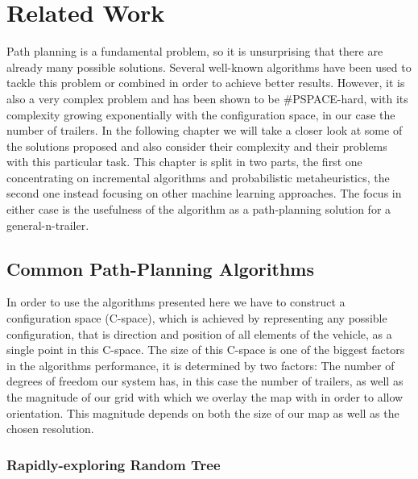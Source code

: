 \chapter{Related Work}
\label{cha:related_work}

Path planning is a fundamental problem, so it is unsurprising that there are already many possible solutions. Several well-known algorithms have been used to tackle this problem or combined in order to achieve better results. However, it is also a very complex problem and has been shown to be %
#PSPACE-hard, with its complexity growing exponentially with the configuration space, in our case the number of trailers. \cite{1} In the following chapter we will take a closer look at some of the solutions proposed and also consider their complexity and their problems with this particular task. This chapter is split in two parts, the first one concentrating on incremental algorithms and probabilistic metaheuristics, the second one instead focusing on other machine learning approaches. The focus in either case is the usefulness of the algorithm as a path-planning solution for a general-n-trailer. \pagebreak[4]

\section{Common Path-Planning Algorithms}
\label{sec:common_pathplanning}

In order to use the algorithms presented here we have to construct a configuration space (C-space), which is achieved by representing any possible configuration, that is direction and position of all elements of the vehicle, as a single point in this C-space. The size of this C-space is one of the biggest factors in the algorithms performance, it is determined by two factors: The number of degrees of freedom our system has, in this case the number of trailers, as well as the magnitude of our grid with which we overlay the map with in order to allow orientation. This magnitude depends on both the size of our map as well as the chosen resolution.

\subsection{Rapidly-exploring Random Tree}
\label{sec:rrt}

